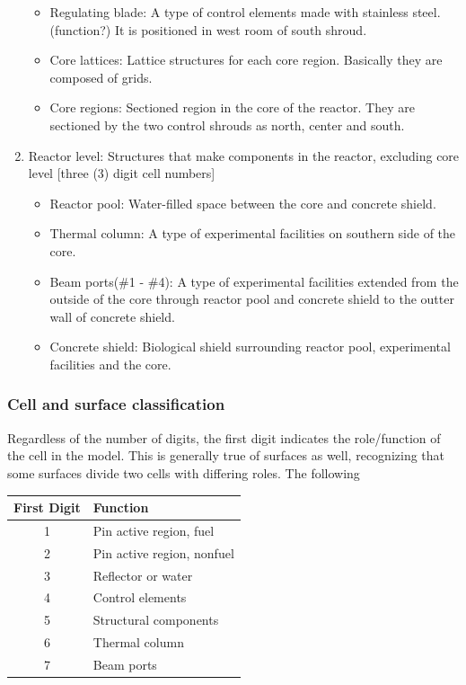 \documentclass{UWNR_modeling}
\begin{document}
\begin{enumerate}
\begin{itemize}
	\item Regulating blade: A type of control elements made with stainless steel. (function?) It is positioned in west room of south shroud.
	\item Core lattices: Lattice structures for each core region. Basically they are composed of grids.
	\item Core regions: Sectioned region in the core of the reactor. They are sectioned by the two control shrouds as north, center and south.
	\end{itemize}
\item Reactor level: Structures that make components in the reactor, excluding core level [three (3) digit cell numbers]
	\begin{itemize}
	\item Reactor pool: Water-filled space between the core and concrete shield.
	\item Thermal column: A type of experimental facilities on southern side of the core.
	\item Beam ports(\#1 - \#4): A type of experimental facilities extended from the outside of the core through reactor pool and concrete shield to the outter wall of concrete shield.
	\item Concrete shield: Biological shield surrounding reactor pool, experimental facilities and the core.
\end{itemize}
\end{enumerate}


\subsubsection{Cell and surface classification}

Regardless of the number of digits, the first digit indicates the role/function of the cell in the model.  This is generally true of surfaces as well, recognizing that some surfaces divide two cells with differing roles.  The following

\begin{tabular}{|c|l|}
\hline First Digit & Function\\\hline
1 & Pin active region, fuel\\
2 & Pin active region, nonfuel\\
3 & Reflector or water\\
4 & Control elements\\
5 & Structural components\\
6 & Thermal column\\
7 & Beam ports\\\hline
\end{tabular}
\end{document}
